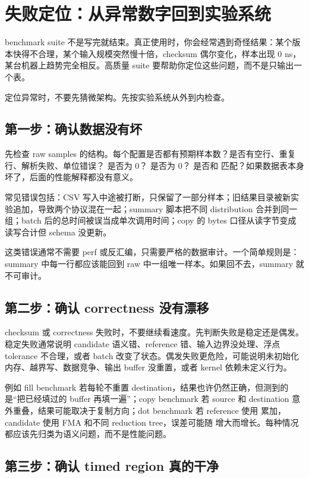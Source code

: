 \section{失败定位：从异常数字回到实验系统}

benchmark suite 不是写完就结束。真正使用时，你会经常遇到奇怪结果：某个版本快得不合理，某个输入规模突然慢十倍，checksum 偶尔变化，样本出现 0 ns，某台机器上趋势完全相反。高质量 suite 要帮助你定位这些问题，而不是只输出一个表。

定位异常时，不要先猜微架构。先按实验系统从外到内检查。

\subsection{第一步：确认数据没有坏}

先检查 raw samples 的结构。每个配置是否都有预期样本数？是否有空行、重复行、解析失败、单位错误？ 是否为 0？ 是否为 0？ 是否和  匹配？如果数据表本身坏了，后面的性能解释都没有意义。

常见错误包括：CSV 写入中途被打断，只保留了一部分样本；旧结果目录被新实验追加，导致两个协议混在一起；summary 脚本把不同 distribution 合并到同一组；batch 后的总时间被误当成单次调用时间；copy 的 bytes 口径从读字节变成读写合计但 schema 没更新。

这类错误通常不需要 perf 或反汇编，只需要严格的数据审计。一个简单规则是：summary 中每一行都应该能回到 raw 中一组唯一样本。如果回不去，summary 就不可审计。

\subsection{第二步：确认 correctness 没有漂移}

checksum 或 correctness 失败时，不要继续看速度。先判断失败是稳定还是偶发。稳定失败通常说明 candidate 语义错、reference 错、输入边界没处理、浮点 tolerance 不合理，或者 batch 改变了状态。偶发失败更危险，可能说明未初始化内存、越界写、数据竞争、输出 buffer 没重置，或者 kernel 依赖未定义行为。

例如 fill benchmark 若每轮不重置 destination，结果也许仍然正确，但测到的是“把已经填过的 buffer 再填一遍”；copy benchmark 若 source 和 destination 意外重叠，结果可能取决于复制方向；dot benchmark 若 reference 使用  累加，candidate 使用 FMA 和不同 reduction tree，误差可能随  增大而增长。每种情况都应该先归类为语义问题，而不是性能问题。

\subsection{第三步：确认 timed region 真的干净}

